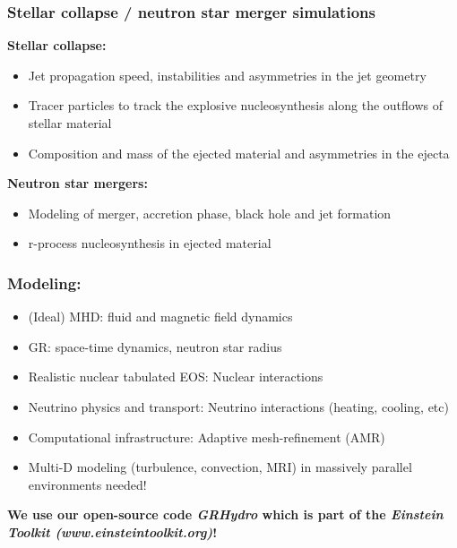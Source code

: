 \begin{frame}
\frametitle{Stellar collapse / neutron star merger simulations}
\begin{center}
\vspace{-0.5cm}
{\bf Stellar collapse:}
\begin{itemize}
\item Jet propagation speed, instabilities and asymmetries in the jet geometry 
\item Tracer particles to track the explosive nucleosynthesis along the outflows of stellar material
\item Composition and mass of the ejected material and asymmetries in the ejecta
\end{itemize}
\vspace{0.5cm}
{\bf Neutron star mergers:}
\begin{itemize}
\item Modeling of merger, accretion phase, black hole and jet formation
\item r-process nucleosynthesis in ejected material  
\end{itemize}
\end{center}
\end{frame}

\begin{frame}
\frametitle{Modeling:}
\begin{center}
\begin{itemize}
\item (Ideal) MHD: fluid and magnetic field dynamics 
\item GR: space-time dynamics, neutron star radius
\item Realistic nuclear tabulated EOS: Nuclear interactions
\item Neutrino physics and transport: Neutrino interactions (heating, cooling, etc)
\item Computational infrastructure: Adaptive mesh-refinement (AMR)
\item Multi-D modeling (turbulence, convection, MRI) in massively parallel environments needed!
\end{itemize}
\vspace{0.5cm} 
\bf{We use our open-source code \textit{GRHydro} which is part of the \textit{Einstein Toolkit (www.einsteintoolkit.org)}}!
\end{center}
\end{frame}

